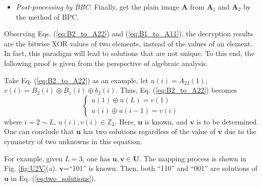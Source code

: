 \documentclass[final,3p,times,twocolumn]{elsarticle}
\begin{document}
\begin{itemize}
	Step 3. Recover $\bm{A}_{11}$ by performing the bitwise XOR operations between $\bm{B}_{1}$, $\bm{A}_{2}$ and $\bm{b}_{1}$, given as
	\begin{equation}
	\left\{ \begin{array}{l}
	A_{11}(1) \oplus A_{11}(L) = B_1(1) \oplus A_{2}(1) \oplus b_{1}(1)\\
	A_{11}(i) \oplus A_{11}(i-1) B_1(i) \oplus A_{2}(i) \oplus b_{1}(i)
	\end{array} \right.
	\label{eq:B1_to_A11}
	\end{equation}
	where $i=2 \sim L$.
	
	Step 4. Obtain $sum_1$ by Eq. (\ref{eq:sum1}), and then get $\bm{A}_{1}$ by doing cyclic left shift operation on $\bm{A}_{11}$ with $sum_1$ bits.
	
	\item \emph{Post-processing by BBC}:
	Finally, get the plain image $\bm{A}$ from $\bm{A}_1$ and $\bm{A}_2$ by the method of BPC.
\end{itemize}

Observing Eqs. (\ref{eq:B2_to_A22}) and (\ref{eq:B1_to_A11}), the decryption results are the bitwise XOR values of two elements, instead of the values of an element. In fact, this paradigm will lead to solutions that are not unique. To this end, the following proof is given from the perspective of algebraic analysis. 

Take Eq. (\ref{eq:B2_to_A22}) as an example, let $u(i)=A_{22}(1)$, $v(i)=B_2(i) \oplus B_{1}(i) \oplus b_{2}(i)$. Thus, Eq. (\ref{eq:B2_to_A22}) becomes
\begin{equation}
\left\{ \begin{array}{l}
u(1) \oplus u(L)  = v(1)\\
u(i) \oplus u(i-1) = v(i)
\end{array} \right.
\label{eq:two_solutions}
\end{equation}
where $i=2 \sim L$, $u(i),v(i) \in \mathbb{Z}_{2}$. Here, $\bm{u}$ is known, and $\bm{v}$ is to be determined.
One can conclude that $\bm{u}$ has two solutions regardless of the value of $\bm{v}$ due to the symmetry of two unknowns in this equation.

For example, given $L=3$, one has $\bm{u},\bm{v} \in \bm{U}$. The mapping process is shown in Fig. \ref{fig:U2V}(a). $\bm{v}$=``101'' is known. Then, both ``110'' and ``001'' are solutions of $\bm{u}$ in Eq. (\ref{eq:two_solutions}).

\end{document}
